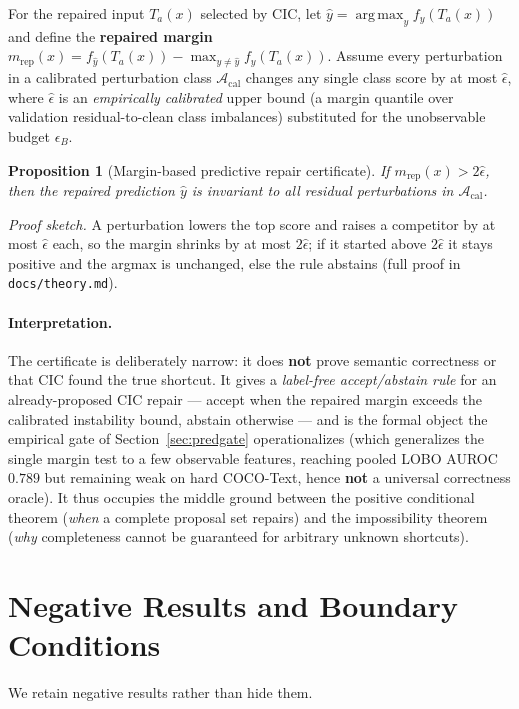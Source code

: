 \documentclass[11pt]{article}
\newtheorem{proposition}{Proposition}
\newcommand{\argmax}{\operatorname*{arg\,max}}
\begin{document}
For the repaired input $T_a(x)$ selected by CIC, let $\hat y=\argmax_y f_y(T_a(x))$ and
define the \textbf{repaired margin}
$m_{\mathrm{rep}}(x) = f_{\hat y}(T_a(x)) - \max_{y\neq\hat y} f_y(T_a(x))$. Assume every
perturbation in a calibrated perturbation class $\mathcal{A}_{\mathrm{cal}}$ changes any
single class score by at most $\hat\epsilon$, where $\hat\epsilon$ is an
\emph{empirically calibrated} upper bound (a margin quantile over validation
residual-to-clean class imbalances) substituted for the unobservable budget $\epsilon_B$.

\begin{proposition}[Margin-based predictive repair certificate]\label{prop:predcert}
If $m_{\mathrm{rep}}(x) > 2\hat\epsilon$, then the repaired prediction $\hat y$ is
invariant to all residual perturbations in $\mathcal{A}_{\mathrm{cal}}$.
\end{proposition}
\emph{Proof sketch.} A perturbation lowers the top score and raises a competitor by at
most $\hat\epsilon$ each, so the margin shrinks by at most $2\hat\epsilon$; if it started
above $2\hat\epsilon$ it stays positive and the argmax is unchanged, else the rule
abstains (full proof in \texttt{docs/theory.md}).

\paragraph{Interpretation.} The certificate is deliberately narrow: it does \textbf{not}
prove semantic correctness or that CIC found the true shortcut. It gives a
\emph{label-free accept/abstain rule} for an already-proposed CIC repair --- accept when
the repaired margin exceeds the calibrated instability bound, abstain otherwise --- and is
the formal object the empirical gate of Section~\ref{sec:predgate} operationalizes (which
generalizes the single margin test to a few observable features, reaching pooled LOBO
AUROC $0.789$ but remaining weak on hard COCO-Text, hence \textbf{not} a universal
correctness oracle). It thus occupies the middle ground between the positive conditional
theorem (\emph{when} a complete proposal set repairs) and the impossibility theorem
(\emph{why} completeness cannot be guaranteed for arbitrary unknown shortcuts).

\section{Negative Results and Boundary Conditions}\label{sec:negative}
We retain negative results rather than hide them.
\end{document}
